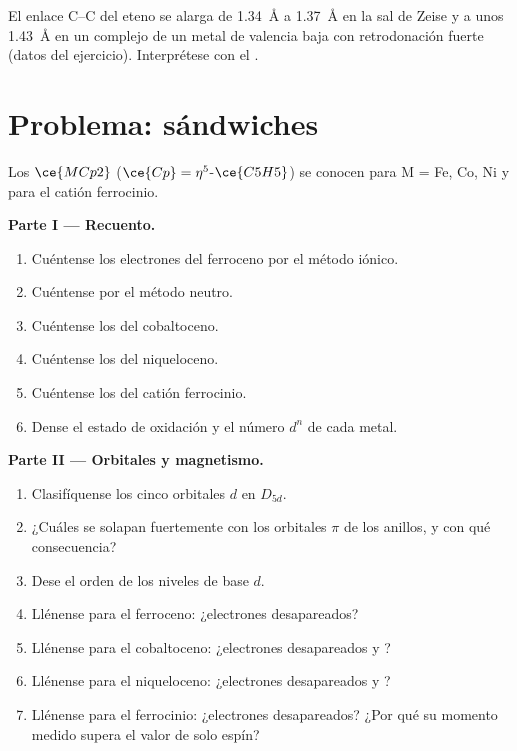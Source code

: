 \begin{exercise}[$\star\star\star$]\label{exo:b3:organometallic-bonding:12}
El enlace C--C del eteno se alarga de \qty{1.34}{\angstrom} a \qty{1.37}{\angstrom} en la sal de Zeise y a
unos \qty{1.43}{\angstrom} en un complejo de un metal de valencia baja con retrodonación fuerte (datos del
ejercicio). Interprétese con el .
\end{exercise}

\section{Problema: sándwiches}

\begin{problem}
\label{pb:b3:organometallic-bonding:1}
Los  $\ce{MCp2}$ ($\ce{Cp} = \eta^5$-$\ce{C5H5}$) se conocen para M = Fe, Co, Ni y para el catión ferrocinio.

\medskip\noindent\textbf{Parte I --- Recuento.}
\begin{enumerate}
  \item Cuéntense los electrones del ferroceno por el método iónico.
  \item Cuéntense por el método neutro.
  \item Cuéntense los del cobaltoceno.
  \item Cuéntense los del niqueloceno.
  \item Cuéntense los del catión ferrocinio.
  \item Dense el estado de oxidación y el número $d^n$ de cada metal.
\end{enumerate}

\medskip\noindent\textbf{Parte II --- Orbitales y magnetismo.}
\begin{enumerate}[resume]
  \item Clasifíquense los cinco orbitales $d$ en $D_{5d}$.
  \item ¿Cuáles se solapan fuertemente con los orbitales $\pi$ de los anillos, y con qué
        consecuencia?
  \item Dese el orden de los niveles de base $d$.
  \item Llénense para el ferroceno: ¿electrones desapareados?
  \item Llénense para el cobaltoceno: ¿electrones desapareados y ?
  \item Llénense para el niqueloceno: ¿electrones desapareados y ?
  \item Llénense para el ferrocinio: ¿electrones desapareados? ¿Por qué su momento medido
        supera el valor de solo espín?
\end{enumerate}


\end{problem}
